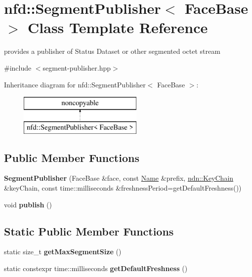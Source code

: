 \hypertarget{classnfd_1_1SegmentPublisher}{}\section{nfd\+:\+:Segment\+Publisher$<$ Face\+Base $>$ Class Template Reference}
\label{classnfd_1_1SegmentPublisher}


provides a publisher of Status Dataset or other segmented octet stream  




{\ttfamily \#include $<$segment-\/publisher.\+hpp$>$}

Inheritance diagram for nfd\+:\+:Segment\+Publisher$<$ Face\+Base $>$\+:\begin{figure}[H]
\begin{center}
\leavevmode
\includegraphics[height=2.000000cm]{classnfd_1_1SegmentPublisher}
\end{center}
\end{figure}
\subsection*{Public Member Functions}
\begin{DoxyCompactItemize}
\item 
{\bfseries Segment\+Publisher} (Face\+Base \&face, const \hyperlink{classndn_1_1Name}{Name} \&prefix, \hyperlink{classndn_1_1security_1_1KeyChain}{ndn\+::\+Key\+Chain} \&key\+Chain, const time\+::milliseconds \&freshness\+Period=get\+Default\+Freshness())\hypertarget{classnfd_1_1SegmentPublisher_a46931e4de442961831e1c21ffeba3426}{}\label{classnfd_1_1SegmentPublisher_a46931e4de442961831e1c21ffeba3426}

\item 
void {\bfseries publish} ()\hypertarget{classnfd_1_1SegmentPublisher_a81ce3ad82ac679313edcc7f2e271222b}{}\label{classnfd_1_1SegmentPublisher_a81ce3ad82ac679313edcc7f2e271222b}

\end{DoxyCompactItemize}
\subsection*{Static Public Member Functions}
\begin{DoxyCompactItemize}
\item 
static size\+\_\+t {\bfseries get\+Max\+Segment\+Size} ()\hypertarget{classnfd_1_1SegmentPublisher_a6d5d152fb9cd17bdd35ef2399e4ec72c}{}\label{classnfd_1_1SegmentPublisher_a6d5d152fb9cd17bdd35ef2399e4ec72c}

\item 
static constexpr time\+::milliseconds {\bfseries get\+Default\+Freshness} ()\hypertarget{classnfd_1_1SegmentPublisher_a0757ccc18742681aed6f1b3036b40b32}{}\label{classnfd_1_1SegmentPublisher_a0757ccc18742681aed6f1b3036b40b32}

\end{DoxyCompactItemize}
